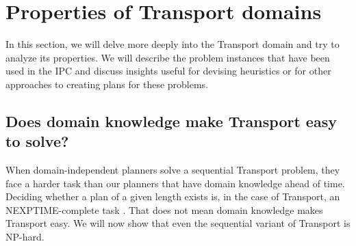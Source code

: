\section{Properties of Transport domains}

In this section, we will delve more deeply into the Transport domain and try to analyze its properties.
We will describe the problem instances that have been used in the IPC and discuss insights useful for devising heuristics or for other approaches to creating plans for these problems.

\subsection{Does domain knowledge make Transport easy to solve?}

When domain-independent planners solve a sequential Transport problem,
they face a harder task than our planners that have domain knowledge ahead of time.
Deciding whether a plan of a given length exists is, in the case of Transport,
an NEXPTIME-complete task \citep[Section~3.4]{Ghallab2004}.
That does not mean domain knowledge makes Transport easy. We will now show
that even the sequential variant of Transport is NP-hard.

